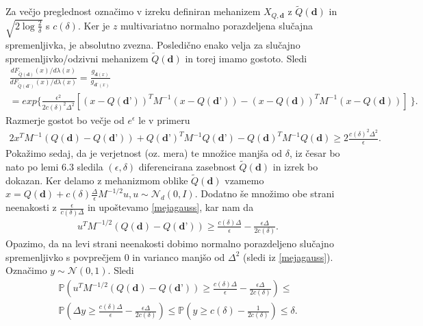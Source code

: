 \documentclass[12pt,a4paper]{amsart}
\theoremstyle{definition} %
\theoremstyle{plain} %
\begin{document}
Za večjo preglednost označimo v izreku definiran mehanizem $X_{Q, \textbf{d}}$ z $\tilde{Q}(\textbf{d})$ in  $\sqrt{2\log{\frac{2}{\delta}}}$ s $c(\delta)$. Ker je $z$ multivariatno normalno porazdeljena slučajna spremenljivka, je absolutno zvezna. Posledično enako velja za slučajno spremenljivko/odzivni mehanizem $\tilde{Q}(\textbf{d})$ in torej imamo gostoto. Sledi
\begin{gather*}
\frac{dF_{\tilde{Q}(\textbf{d})}(x)/d \lambda (x)}{dF_{\tilde{Q}(\textbf{d'})}(x)/d \lambda (x)} = \frac{g_{\textbf{d} (x)}}{g_{\textbf{d'} (x)}} \\ 
=  exp \{ \frac{\epsilon^2}{2c(\delta)^2 \Delta^2} [ (x-Q(\textbf{d'}))^T M^{-1} (x-Q(\textbf{d'})) - (x-Q(\textbf{d}))^T M^{-1} (x-Q(\textbf{d}))]\ \}.
\end{gather*}
Razmerje gostot bo večje od $e^{\epsilon}$ le v primeru
\begin{gather*}
2x^T M^{-1}(Q(\textbf{d})-Q(\textbf{d'})) + Q(\textbf{d'})^T M^{-1} Q(\textbf{d'}) - Q(\textbf{d})^T M^{-1} Q(\textbf{d}) \geq 2 \frac{c(\delta)^2 \Delta^2}{\epsilon}.
\end{gather*}
Pokažimo sedaj, da je verjetnost (oz. mera) te množice manjša od $\delta$, iz česar bo nato po lemi 6.3 sledila $(\epsilon, \delta)$  diferencirana zasebnost $\tilde{Q}(\textbf{d})$ in izrek bo dokazan.
\newline
\newline
Ker delamo z mehanizmom oblike $\tilde{Q}(\textbf{d})$ vzamemo $x = Q(\textbf{d}) + c(\delta) \frac{\Delta}{\epsilon} M^{-1/2}u, u \sim \mathcal{N}_d (0,I)$. Dodatno še množimo obe strani neenakosti z $\frac{\epsilon}{c(\delta)\Delta}$ in upoštevamo \eqref{mejagauss}, kar nam da
\begin{gather*}
u^T M^{-1/2}(Q(\textbf{d})-Q(\textbf{d'})) \geq \frac{c(\delta)\Delta}{\epsilon} - \frac{\epsilon \Delta}{2 c(\delta)}.
\end{gather*}
Opazimo, da na levi strani neenakosti dobimo normalno porazdeljeno slučajno spremenljivko s povprečjem 0 in varianco manjšo od $\Delta^2$ (sledi iz \eqref{mejagauss}). Označimo $y \sim \mathcal{N}(0,1)$. Sledi 
\begin{gather*}
\mathbb{P}(u^T M^{-1/2}(Q(\textbf{d})-Q(\textbf{d'})) \geq \frac{c(\delta)\Delta}{\epsilon} - \frac{\epsilon \Delta}{2 c(\delta)}) \leq \\
\mathbb{P}(\Delta y \geq \frac{c(\delta)\Delta}{\epsilon} - \frac{\epsilon \Delta}{2 c(\delta)}) \leq \mathbb{P}(y \geq c(\delta) - \frac{1}{2 c(\delta)}) \leq \delta.
\end{gather*}
\end{document}
